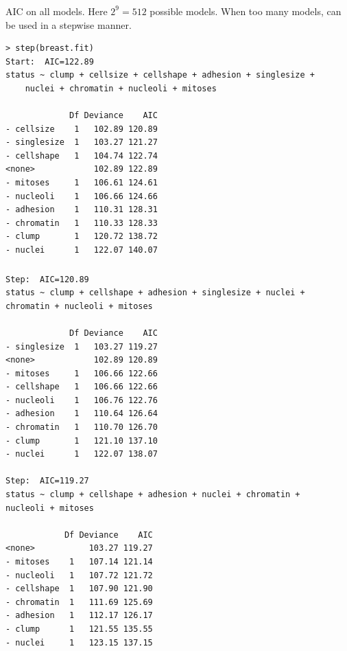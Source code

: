 \documentclass{beamer}
\begin{document}
\begin{frame}[fragile]
\frametitle{}
AIC on all models. Here $2^9 = 512$ possible models. When too many models, can be
used in a stepwise manner.

{\tiny
\begin{verbatim}
> step(breast.fit)
Start:  AIC=122.89
status ~ clump + cellsize + cellshape + adhesion + singlesize + 
    nuclei + chromatin + nucleoli + mitoses

             Df Deviance    AIC
- cellsize    1   102.89 120.89
- singlesize  1   103.27 121.27
- cellshape   1   104.74 122.74
<none>            102.89 122.89
- mitoses     1   106.61 124.61
- nucleoli    1   106.66 124.66
- adhesion    1   110.31 128.31
- chromatin   1   110.33 128.33
- clump       1   120.72 138.72
- nuclei      1   122.07 140.07

\end{verbatim}
}
\end{frame}

\begin{frame}[fragile]
\frametitle{}
{\tiny
\begin{verbatim}
Step:  AIC=120.89
status ~ clump + cellshape + adhesion + singlesize + nuclei +  chromatin + nucleoli + mitoses

             Df Deviance    AIC
- singlesize  1   103.27 119.27
<none>            102.89 120.89
- mitoses     1   106.66 122.66
- cellshape   1   106.66 122.66
- nucleoli    1   106.76 122.76
- adhesion    1   110.64 126.64
- chromatin   1   110.70 126.70
- clump       1   121.10 137.10
- nuclei      1   122.07 138.07

Step:  AIC=119.27
status ~ clump + cellshape + adhesion + nuclei + chromatin +    nucleoli + mitoses

            Df Deviance    AIC
<none>           103.27 119.27
- mitoses    1   107.14 121.14
- nucleoli   1   107.72 121.72
- cellshape  1   107.90 121.90
- chromatin  1   111.69 125.69
- adhesion   1   112.17 126.17
- clump      1   121.55 135.55
- nuclei     1   123.15 137.15

\end{verbatim}
}
\end{frame}
\end{document}
